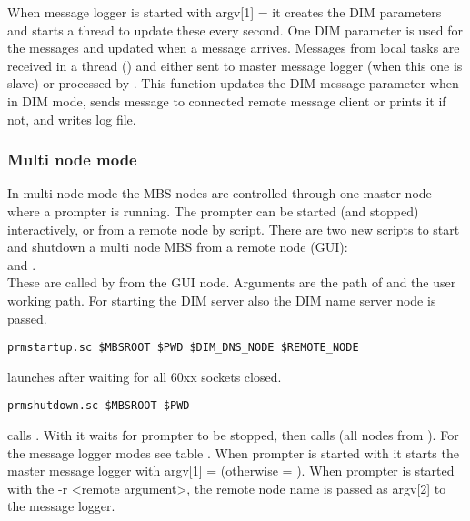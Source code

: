 When message logger is started with argv[1] =  it creates the DIM parameters and starts a thread to update these every second. One DIM parameter is used for the messages and updated when a message arrives. Messages from local tasks are received in a thread () and either sent to master message logger (when this one is slave) or processed by . This function updates the DIM message parameter when in DIM mode, sends message to connected remote message client or prints it if not, and writes log file.
\subsubsection{Multi node mode}
In multi node mode the MBS nodes are controlled through one master node where a prompter is running. The prompter can be started (and stopped) interactively, or from a remote node by script. There are two new scripts to start and shutdown a multi node MBS from a remote node (GUI): \\
 and . \\
These are called by  from the GUI node. Arguments are the path of  and the user working path. For starting the DIM server also the DIM name server node is passed.
\begin{verbatim}
prmstartup.sc $MBSROOT $PWD $DIM_DNS_NODE $REMOTE_NODE 
\end{verbatim}
launches  after waiting for all 60xx sockets closed.
\begin{verbatim}
prmshutdown.sc $MBSROOT $PWD 
\end{verbatim}
calls . With  it waits for prompter to be stopped, then calls  (all nodes from ).
For the message logger modes see table .
 When prompter is started with  it starts the master message logger with argv[1] = (otherwise = ). When prompter is started with the -r <remote argument>, the remote node name is passed as argv[2] to the message logger.

